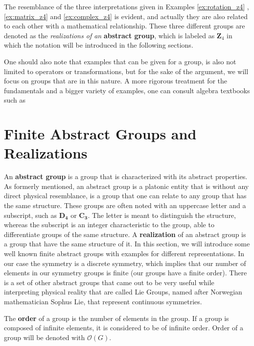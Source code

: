 The resemblance of the three interpretations given in Examples \ref{ex:rotation_z4} , \ref{ex:matrix_z4} and \ref{ex:complex_z4} is evident, and actually they are also related to each other with a mathematical relationship. These three different groups are denoted as the \emph{realizations of an} \textbf{abstract group}, which is labeled as $\mathbf{Z}_4$ in which the notation will be introduced in the following sections.

One should also note that examples that can be given for a group, is also not limited to operators or transformations, but for the sake of the argument, we will focus on groups that are in this nature. A more rigorous treatment for the fundamentals and a bigger variety of examples, one can consult algebra textbooks such as \citet{lang_algebra_2002}

\section{Finite Abstract Groups and Realizations}
An \textbf{abstract group}  is a group that is characterized with its abstract properties. As formerly mentioned, an abstract group is a platonic entity that is without any direct physical resemblance, is a group that one can relate to any group that has the same structure. These groups are often noted with an uppercase letter and a subscript, such as $\mathbf{D_4}$ or $\mathbf{C_3}$. The letter is meant to distinguish the structure, whereas the subscript is an integer characteristic to the group, able to differentiate groups of the same structure. A \textbf{realization} of an abstract group is a group that have the same structure of it. \cite{rosen_symmetry_1995}In this section, we will introduce some well known finite abstract groups with examples for different representations. In our case the symmetry is a discrete symmetry, which implies that our number of elements in our symmetry groups is finite (our groups have a finite order). There is a set of other abstract groups that came out to be very useful while interpreting physical reality that are called Lie Groups, named after Norwegian mathematician Sophus Lie, that represent continuous symmetries.

\begin{definition}
The \textbf{order}  of a group is the number of elements in the group. If a group is composed of infinite elements, it is considered to be of infinite order. Order of a group will be denoted with $ \mathcal{O}(G) $. 
\cite{rosen_symmetry_1995}
\end{definition}


